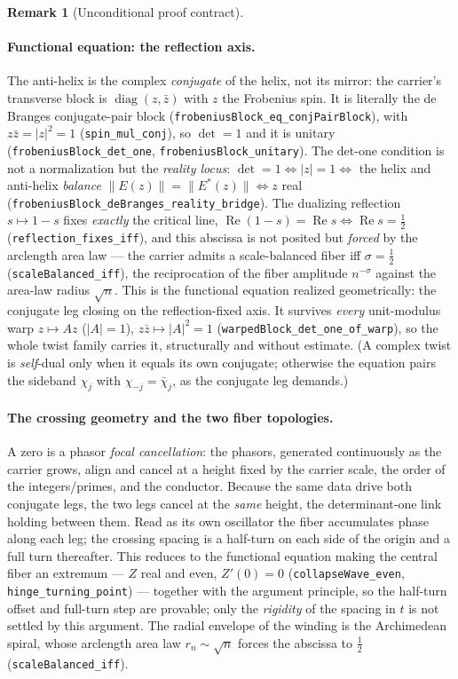 \documentclass[11pt]{article}
\theoremstyle{definition}
\newtheorem{remark}[theorem]{Remark}
\renewcommand{\Re}{\operatorname{Re}}
\begin{document}
\begin{remark}[Unconditional proof contract]
\begin{enumerate}
\paragraph{Functional equation: the reflection axis.} The anti-helix is the complex \emph{conjugate}
of the helix, not its mirror: the carrier's transverse block is $\operatorname{diag}(z,\bar z)$ with
$z$ the Frobenius spin. It is literally the de Branges conjugate-pair block
(\texttt{frobeniusBlock\_eq\_conjPairBlock}), with $z\bar z=|z|^2=1$ (\texttt{spin\_mul\_conj}), so
$\det=1$ and it is unitary (\texttt{frobeniusBlock\_det\_one}, \texttt{frobeniusBlock\_unitary}). The
det-one condition is not a normalization but the \emph{reality locus}:
$\det=1\iff|z|=1\iff$ the helix and anti-helix \emph{balance} $\|E(z)\|=\|E^{*}(z)\|\iff z$ real
(\texttt{frobeniusBlock\_deBranges\_reality\_bridge}). The dualizing reflection $s\mapsto1-s$ fixes
\emph{exactly} the critical line, $\Re(1-s)=\Re s\iff\Re s=\tfrac12$ (\texttt{reflection\_fixes\_iff}),
and this abscissa is not posited but \emph{forced} by the arclength area law --- the carrier admits a
scale-balanced fiber iff $\sigma=\tfrac12$ (\texttt{scaleBalanced\_iff}), the reciprocation of the
fiber amplitude $n^{-\sigma}$ against the area-law radius $\sqrt n$. This is the functional equation
realized geometrically: the conjugate leg closing on the reflection-fixed axis. It survives
\emph{every} unit-modulus warp $z\mapsto Az$ ($|A|=1$), $z\bar z\mapsto|A|^2=1$
(\texttt{warpedBlock\_det\_one\_of\_warp}), so the whole twist family carries it, structurally and
without estimate. (A complex twist is \emph{self}-dual only when it equals its own conjugate;
otherwise the equation pairs the sideband $\chi_j$ with $\chi_{-j}=\bar\chi_j$, as the conjugate leg
demands.)

\paragraph{The crossing geometry and the two fiber topologies.} A zero is a phasor \emph{focal
cancellation}: the phasors, generated continuously as the carrier grows, align and cancel at a height
fixed by the carrier scale, the order of the integers/primes, and the conductor. Because the same data
drive both conjugate legs, the two legs cancel at the \emph{same} height, the determinant-one link
holding between them. Read as its own oscillator the fiber accumulates phase along each leg; the
crossing spacing is a half-turn on each side of the origin and a full turn thereafter. This reduces to
the functional equation making the central fiber an extremum --- $Z$ real and even, $Z'(0)=0$
(\texttt{collapseWave\_even}, \texttt{hinge\_turning\_point}) --- together with the argument principle,
so the half-turn offset and full-turn step are provable; only the \emph{rigidity} of the spacing in $t$
is not settled by this argument. The radial envelope of the winding is the Archimedean spiral, whose arclength area
law $r_n\sim\sqrt n$ forces the abscissa to $\tfrac12$ (\texttt{scaleBalanced\_iff}).


\end{enumerate}
\end{remark}
\end{document}
